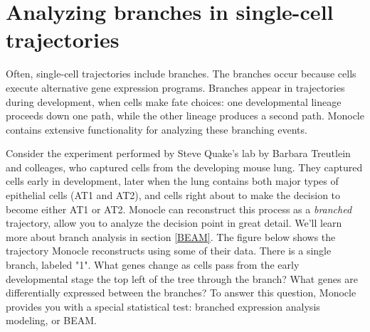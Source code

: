 \documentclass[10pt,oneside]{article}\usepackage[]{graphicx}\usepackage[]{color}
\begin{document}
\section{Analyzing branches in single-cell trajectories} \label{BEAM_trajectory}

Often, single-cell trajectories include branches. The branches occur because cells execute alternative gene expression programs. Branches appear in trajectories during development, when cells make fate choices: one developmental lineage proceeds down one path, while the other lineage produces a second path. Monocle contains extensive functionality for analyzing these branching events. 

Consider the experiment performed by Steve Quake's lab by Barbara Treutlein and colleages, who captured cells from the developing mouse lung. They captured cells early in development, later when the lung contains both major types of epithelial cells (AT1 and AT2), and cells right about to make the decision to become either AT1 or AT2. Monocle can reconstruct this process as a \emph{branched} trajectory, allow you to analyze the decision point in great detail. We'll learn more about branch analysis in section \ref{BEAM}. The figure below shows the trajectory Monocle reconstructs using some of their data. There is a single branch, labeled "1". What genes change as cells pass from the early developmental stage the top left of the tree through the branch? What genes are differentially expressed between the branches? To answer this question, Monocle provides you with a special statistical test: branched expression analysis modeling, or BEAM.
\end{document}
